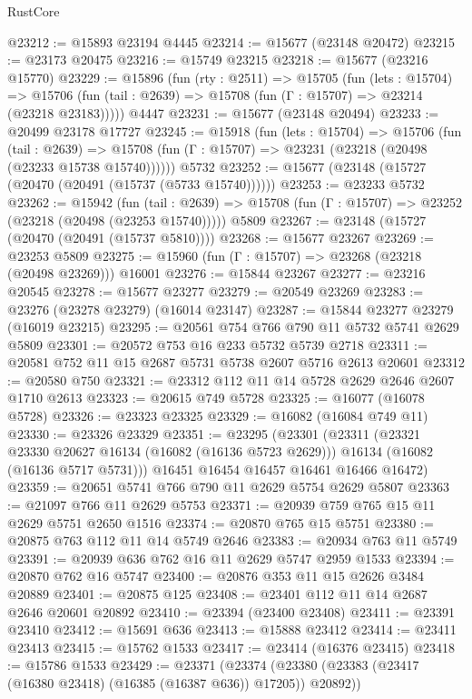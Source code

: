 \begin{lexlean}{RustCore}
\begin{coremodule}
@23212 := @15893 @23194 @4445
@23214 := @15677 (@23148 @20472)
@23215 := @23173 @20475
@23216 := @15749 @23215
@23218 := @15677 (@23216 @15770)
@23229 := @15896
    (fun (rty : @2511) =>
    @15705
      (fun (lets : @15704) =>
      @15706 (fun (tail : @2639) => @15708 (fun (Γ : @15707) => @23214 (@23218 @23183)))))
    @4447
@23231 := @15677 (@23148 @20494)
@23233 := @20499 @23178 @17727
@23245 := @15918
    (fun (lets : @15704) =>
    @15706
      (fun (tail : @2639) =>
      @15708 (fun (Γ : @15707) => @23231 (@23218 (@20498 (@23233 @15738 @15740))))))
    @5732
@23252 := @15677 (@23148 (@15727 (@20470 (@20491 (@15737 (@5733 @15740))))))
@23253 := @23233 @5732
@23262 := @15942
    (fun (tail : @2639) => @15708 (fun (Γ : @15707) => @23252 (@23218 (@20498 (@23253 @15740)))))
    @5809
@23267 := @23148 (@15727 (@20470 (@20491 (@15737 @5810))))
@23268 := @15677 @23267
@23269 := @23253 @5809
@23275 := @15960 (fun (Γ : @15707) => @23268 (@23218 (@20498 @23269))) @16001
@23276 := @15844 @23267
@23277 := @23216 @20545
@23278 := @15677 @23277
@23279 := @20549 @23269
@23283 := @23276 (@23278 @23279) (@16014 @23147)
@23287 := @15844 @23277 @23279 (@16019 @23215)
@23295 := @20561 @754 @766 @790 @11 @5732 @5741 @2629 @5809
@23301 := @20572 @753 @16 @233 @5732 @5739 @2718
@23311 := @20581 @752 @11 @15 @2687 @5731 @5738 @2607 @5716 @2613 @20601
@23312 := @20580 @750
@23321 := @23312 @112 @11 @14 @5728 @2629 @2646 @2607 @1710 @2613
@23323 := @20615 @749 @5728
@23325 := @16077 (@16078 @5728)
@23326 := @23323 @23325
@23329 := @16082 (@16084 @749 @11)
@23330 := @23326 @23329
@23351 := @23295
    (@23301
      (@23311
        (@23321 @23330 @20627 @16134 (@16082 (@16136 @5723 @2629)))
        @16134
        (@16082 (@16136 @5717 @5731)))
      @16451
      @16454
      @16457
      @16461
      @16466
      @16472)
@23359 := @20651 @5741 @766 @790 @11 @2629 @5754 @2629 @5807
@23363 := @21097 @766 @11 @2629 @5753
@23371 := @20939 @759 @765 @15 @11 @2629 @5751 @2650 @1516
@23374 := @20870 @765 @15 @5751
@23380 := @20875 @763 @112 @11 @14 @5749 @2646
@23383 := @20934 @763 @11 @5749
@23391 := @20939 @636 @762 @16 @11 @2629 @5747 @2959 @1533
@23394 := @20870 @762 @16 @5747
@23400 := @20876 @353 @11 @15 @2626 @3484 @20889
@23401 := @20875 @125
@23408 := @23401 @112 @11 @14 @2687 @2646 @20601 @20892
@23410 := @23394 (@23400 @23408)
@23411 := @23391 @23410
@23412 := @15691 @636
@23413 := @15888 @23412
@23414 := @23411 @23413
@23415 := @15762 @1533
@23417 := @23414 (@16376 @23415)
@23418 := @15786 @1533
@23429 := @23371
    (@23374 (@23380 (@23383 (@23417 (@16380 @23418) (@16385 (@16387 @636)) @17205)) @20892))

\end{coremodule}
\end{lexlean}
